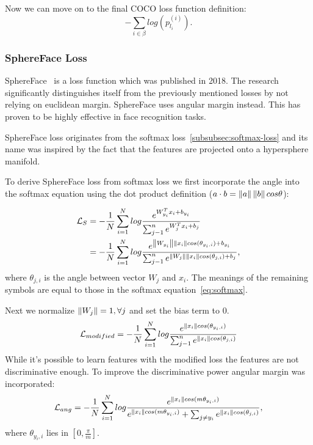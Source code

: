 Now we can move on to the final COCO loss function definition:
\begin{equation}
    - \sum_{i \in \beta} log \left( p_{l_i}^{(i)} \right).
\end{equation}

\subsubsection{SphereFace Loss}
SphereFace~\cite{SphereFace} is a loss function which was published in 2018.
The research significantly distinguishes itself from the previously mentioned losses by not relying on euclidean margin.
SphereFace uses angular margin instead.
This has proven to be highly effective in face recognition tasks.

SphereFace loss originates from the softmax loss~\ref{subsubsec:softmax-loss} and its name was inspired by the fact
that the features are projected onto a hypersphere manifold.

To derive SphereFace loss from softmax loss we first incorporate the angle into the softmax equation using the dot
product definition ($a \cdot b = \left\lVert a\right\rVert \left\lVert b\right\rVert cos \theta$):

\begin{align*}
    \mathcal{L}_S &= -\frac{1}{N} \sum_{i=1}^{N} log \frac{e^{W^T_{y_i} x_{i} + b_{y_i}}}
    {\sum_{j-1}^{n} e^{W^T_{j} x_{i} + b_{j}}} \\
    &= -\frac{1}{N} \sum_{i=1}^{N} log \frac{e^{\left\lVert W_{y_i}\right\rVert \left\lVert x_i\right\rVert cos(\theta_{y_i,i}) + b_{y_i}}}
    {\sum_{j-1}^{n} e^{\left\lVert W_j\right\rVert \left\lVert x_{i}\right\rVert cos(\theta_{j,i}) + b_{j}}},
\end{align*}
where $\theta_{j,i}$ is the angle between vector $W_j$ and $x_i$.
The meanings of the remaining symbols are equal to those in the softmax equation~\ref{eq:softmax}.


Next we normalize $\left\lVert W_j\right\rVert = 1, \forall j$ and set the bias term to 0.
\begin{equation}
    \mathcal{L}_{modified} = -\frac{1}{N} \sum_{i=1}^{N} log \frac{e^{\left\lVert x_i\right\rVert cos(\theta_{y_i,i})}}
    {\sum_{j-1}^{n} e^{\left\lVert x_{i}\right\rVert cos(\theta_{j,i})}}
\end{equation}
While it's possible to learn features with the modified loss the features are not discriminative enough.
To improve the discriminative power angular margin was incorporated:
\begin{equation}\label{eq:ang}
\mathcal{L}_{ang} = -\frac{1}{N} \sum_{i=1}^{N} log \frac{e^{\left\lVert x_i\right\rVert cos(m\theta_{y_i,i})}}
{e^{\left\lVert x_i\right\rVert cos(m\theta_{y_i,i})} + \sum_{j \neq y_i} e^{\left\lVert x_{i}\right\rVert cos(\theta_{j,i})}},
\end{equation}
where $\theta_{y_i,i}$ lies in $\left[ 0, \frac{\pi}{m} \right]$.

